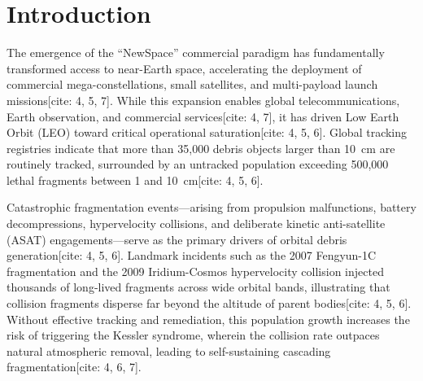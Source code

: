 \documentclass[12pt,letterpaper,twoside]{book}
\begin{document}
\cleardoublepage

\tableofcontents
\listoffigures
\listoftables

\cleardoublepage

\mainmatter

\chapter{Introduction}
\label{ch:introduction}

The emergence of the ``NewSpace'' commercial paradigm has fundamentally transformed access to near-Earth space, accelerating the deployment of commercial mega-constellations, small satellites, and multi-payload launch missions[cite: 4, 5, 7]. While this expansion enables global telecommunications, Earth observation, and commercial services[cite: 4, 7], it has driven Low Earth Orbit (LEO) toward critical operational saturation[cite: 4, 5, 6]. Global tracking registries indicate that more than 35,000 debris objects larger than 10~cm are routinely tracked, surrounded by an untracked population exceeding 500,000 lethal fragments between 1 and 10~cm[cite: 4, 5, 6].

Catastrophic fragmentation events—arising from propulsion malfunctions, battery decompressions, hypervelocity collisions, and deliberate kinetic anti-satellite (ASAT) engagements—serve as the primary drivers of orbital debris generation[cite: 4, 5, 6]. Landmark incidents such as the 2007 Fengyun-1C fragmentation and the 2009 Iridium-Cosmos hypervelocity collision injected thousands of long-lived fragments across wide orbital bands, illustrating that collision fragments disperse far beyond the altitude of parent bodies[cite: 4, 5, 6]. Without effective tracking and remediation, this population growth increases the risk of triggering the Kessler syndrome, wherein the collision rate outpaces natural atmospheric removal, leading to self-sustaining cascading fragmentation[cite: 4, 6, 7].
\end{document}
